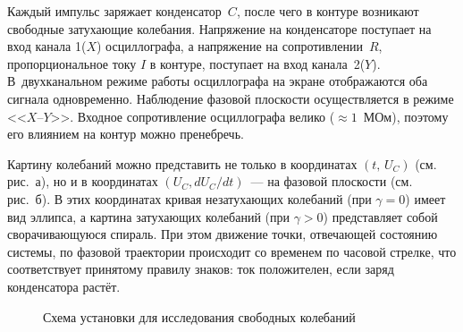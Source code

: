 Каждый импульс заряжает конденсатор~$C$, после чего в контуре возникают 
свободные затухающие колебания. Напряжение на конденсаторе поступает на вход 
канала 1($X$) осциллографа, а напряжение на сопротивлении~$R$, пропорциональное 
току $I$ в контуре, поступает на вход канала~2($Y$). В~двухканальном режиме
работы осциллографа на экране отображаются оба сигнала одновременно. Наблюдение 
фазовой плоскости осуществляется в режиме <<$X$--$Y$>>. Входное сопротивление 
осциллографа велико ($\approx 1$~МОм), поэтому его влиянием на контур 
можно пренебречь.

Картину колебаний можно представить не только в координатах $(t,\, U_C)$
(см. рис.~а), но и в координатах $(U_C, dU_C/dt)$~--- на фазовой плоскости 
(см. рис.~б). В этих координатах кривая незатухающих колебаний 
(при $\gamma=0$) имеет вид эллипса, а картина затухающих колебаний (при $\gamma > 0$) 
представляет собой сворачивающуюся спираль. При этом движение точки, отвечающей 
состоянию системы, по фазовой траектории происходит со временем по часовой стрелке, 
что соответствует принятому правилу знаков: ток положителен, 
если заряд конденсатора растёт.

\begin{figure}[h!]
    \centering
	\caption{Схема установки для исследования свободных колебаний}
\end{figure}

